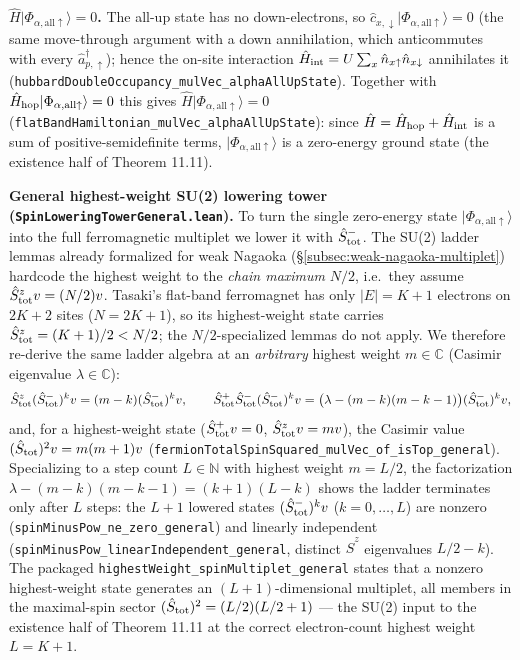 \documentclass[a4paper,11pt]{article}
\begin{document}
\medskip
\noindent\textbf{$\hat H |\Phi_{\alpha,\mathrm{all}\uparrow}\rangle = 0$.}
The all-up state has no down-electrons, so $\hat c_{x,\downarrow}
|\Phi_{\alpha,\mathrm{all}\uparrow}\rangle = 0$ (the same move-through argument
with a down annihilation, which anticommutes with every $\hat a^\dagger_{p,
\uparrow}$); hence the on-site interaction $\hat H_{\rm int} = U\sum_x
\hat n_{x\uparrow}\hat n_{x\downarrow}$ annihilates it
(\texttt{hubbardDoubleOccupancy\_mulVec\_alphaAllUpState}). Together with
$\hat H_{\rm hop}|\Phi_{\alpha,\mathrm{all}\uparrow}\rangle = 0$ this gives
$\hat H|\Phi_{\alpha,\mathrm{all}\uparrow}\rangle = 0$
(\texttt{flatBandHamiltonian\_mulVec\_alphaAllUpState}): since
$\hat H = \hat H_{\rm hop} + \hat H_{\rm int}$ is a sum of positive-semidefinite
terms, $|\Phi_{\alpha,\mathrm{all}\uparrow}\rangle$ is a zero-energy ground state
(the existence half of Theorem 11.11).

\medskip
\noindent\textbf{General highest-weight SU(2) lowering tower
(\texttt{SpinLoweringTowerGeneral.lean}).}
To turn the single zero-energy state $|\Phi_{\alpha,\mathrm{all}\uparrow}\rangle$
into the full ferromagnetic multiplet we lower it with $\hat S^-_{\rm tot}$.
The SU(2) ladder lemmas already formalized for weak Nagaoka
(§\ref{subsec:weak-nagaoka-multiplet}) hardcode the highest weight to the \emph{chain
maximum} $N/2$, i.e.\ they assume $\hat S^z_{\rm tot}v = (N/2)v$. Tasaki's
flat-band ferromagnet has only $|E| = K+1$ electrons on $2K+2$ sites
($N = 2K+1$), so its highest-weight state carries
$\hat S^z_{\rm tot} = (K+1)/2 < N/2$; the $N/2$-specialized lemmas do not apply.
We therefore re-derive the same ladder algebra at an \emph{arbitrary} highest
weight $m\in\mathbb C$ (Casimir eigenvalue $\lambda\in\mathbb C$):
\[
  \hat S^z_{\rm tot}(\hat S^-_{\rm tot})^k v = (m-k)(\hat S^-_{\rm tot})^k v,
  \qquad
  \hat S^+_{\rm tot}\hat S^-_{\rm tot}(\hat S^-_{\rm tot})^k v
    = \bigl(\lambda-(m-k)(m-k-1)\bigr)(\hat S^-_{\rm tot})^k v,
\]
and, for a highest-weight state ($\hat S^+_{\rm tot}v = 0$,
$\hat S^z_{\rm tot}v = mv$), the Casimir value
$(\hat S_{\rm tot})^2 v = m(m+1)v$
(\texttt{fermionTotalSpinSquared\_mulVec\_of\_isTop\_general}). Specializing to a
step count $L\in\mathbb N$ with highest weight $m = L/2$, the factorization
$\lambda - (m-k)(m-k-1) = (k+1)(L-k)$ shows the ladder terminates only after $L$
steps: the $L+1$ lowered states $(\hat S^-_{\rm tot})^k v$ ($k = 0,\dots,L$) are
nonzero (\texttt{spinMinusPow\_ne\_zero\_general}) and linearly independent
(\texttt{spinMinusPow\_linearIndependent\_general}, distinct $\hat S^z$
eigenvalues $L/2-k$). The packaged
\texttt{highestWeight\_spinMultiplet\_general} states that a nonzero
highest-weight state generates an $(L+1)$-dimensional multiplet, all members in
the maximal-spin sector $(\hat S_{\rm tot})^2 = (L/2)(L/2+1)$ --- the SU(2) input
to the existence half of Theorem 11.11 at the correct electron-count highest
weight $L = K+1$.
\end{document}
